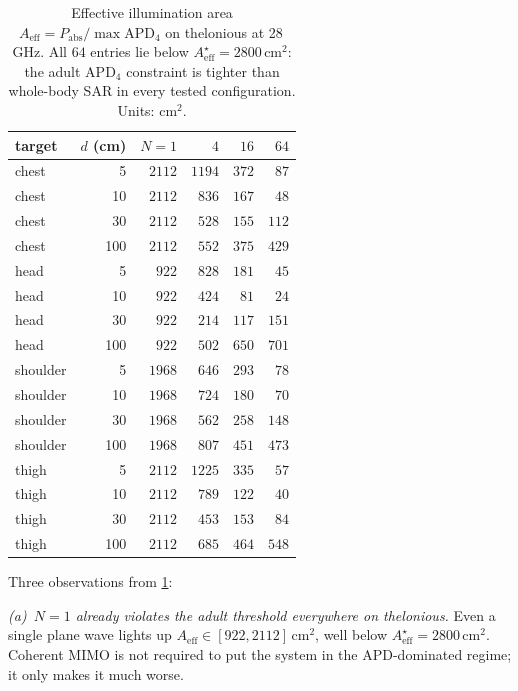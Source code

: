 \documentclass[journal]{IEEEtran}
\newcommand{\APD}{\mathrm{APD}}
\newcommand{\Pabs}{P_{\mathrm{abs}}}
\newcommand{\Aeff}{A_{\mathrm{eff}}}
\begin{document}
\begin{table}[!t]\small
\centering
\caption{Effective illumination area $\Aeff=\Pabs/\max\APD_4$ on
thelonious at 28\,GHz. All $64$ entries lie below
$\Aeff^\star\!=\!2800\,\mathrm{cm}^2$: the adult
$\APD_4$ constraint is tighter than whole-body SAR in every
tested configuration. Units: cm$^2$.}
\label{tab:Aeff}
\begin{tabular}{lr rrrr}
\toprule
target & $d$ (cm)& $N\!=\!1$ & $4$ & $16$ & $64$ \\
\midrule
chest   &   5 & $2112$ & $1194$ & $372$ &  $87$ \\
chest   &  10 & $2112$ &  $836$ & $167$ &  $48$ \\
chest   &  30 & $2112$ &  $528$ & $155$ & $112$ \\
chest   & 100 & $2112$ &  $552$ & $375$ & $429$ \\
\midrule
head    &   5 &  $922$ &  $828$ & $181$ &  $45$ \\
head    &  10 &  $922$ &  $424$ &  $81$ &  $24$ \\
head    &  30 &  $922$ &  $214$ & $117$ & $151$ \\
head    & 100 &  $922$ &  $502$ & $650$ & $701$ \\
\midrule
shoulder&   5 & $1968$ &  $646$ & $293$ &  $78$ \\
shoulder&  10 & $1968$ &  $724$ & $180$ &  $70$ \\
shoulder&  30 & $1968$ &  $562$ & $258$ & $148$ \\
shoulder& 100 & $1968$ &  $807$ & $451$ & $473$ \\
\midrule
thigh   &   5 & $2112$ & $1225$ & $335$ &  $57$ \\
thigh   &  10 & $2112$ &  $789$ & $122$ &  $40$ \\
thigh   &  30 & $2112$ &  $453$ & $153$ &  $84$ \\
thigh   & 100 & $2112$ &  $685$ & $464$ & $548$ \\
\bottomrule
\end{tabular}
\end{table}

Three observations from \cref{tab:Aeff}:

\emph{(a)~$N\!=\!1$ already violates the adult threshold
everywhere on thelonious.} Even a single plane wave lights up
$\Aeff\!\in\![922,2112]\,\mathrm{cm}^2$, well below
$\Aeff^\star\!=\!2800\,\mathrm{cm}^2$. Coherent MIMO is not required
to put the system in the APD-dominated regime; it only makes it
much worse.
\end{document}
